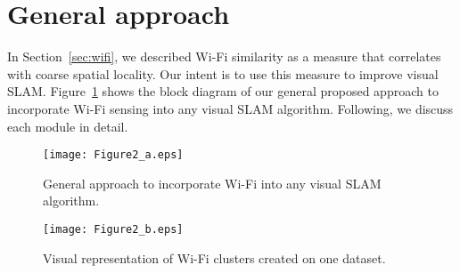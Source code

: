 \section{General approach}
\label{sec:slam}
In Section~\ref{sec:wifi}, we described Wi-Fi similarity as a measure that correlates with coarse spatial locality. Our intent is to use this measure to improve visual SLAM. Figure~\ref{fig:gen_approach} shows the block diagram of our general proposed approach to incorporate Wi-Fi sensing into any visual SLAM algorithm. Following, we discuss each module in detail.
\begin{figure}
	\centering
	\texttt{[image: Figure2\_a.eps]}
	\caption{General approach to incorporate Wi-Fi into any visual SLAM algorithm.}
\label{fig:gen_approach}
\end{figure}
\begin{figure}
	\centering
	\texttt{[image: Figure2\_b.eps]}
	\caption{Visual representation of Wi-Fi clusters created on one dataset.}
\label{fig:cluster_rep}
\end{figure}

